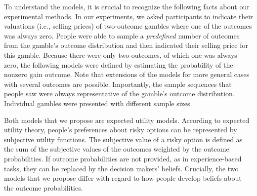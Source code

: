 \documentclass[a4paper,man, natbib]{apa6} %
\begin{document}
To understand the models, it is crucial to recognize the following facts about our experimental methods. In our experiments, we asked participants to indicate their valuations (i.e., selling prices) of two-outcome gambles where one of the outcomes was always zero. People were able to sample a \textit{predefined} number of outcomes from the gamble's outcome distribution and then indicated their selling price for this gamble. Because there were only two outcomes, of which one was always zero, the following models were defined by estimating the probability of the nonzero gain outcome. Note that extensions of the models for more general cases with several outcomes are possible. Importantly, the sample sequences that people saw were always representative of the gamble's outcome distribution. Individual gambles were presented with different sample sizes. 

Both models that we propose are expected utility models. According to expected utility theory, people's preferences about risky options can be represented by subjective utility functions. The subjective value of a risky option is defined as the sum of the subjective values of the outcomes weighted by the outcome probabilities. If outcome probabilities are not provided, as in experience-based tasks, they can be replaced by the decision makers' beliefs. Crucially, the two models that we propose differ with regard to how people develop beliefs about the outcome probabilities.

\end{document}
